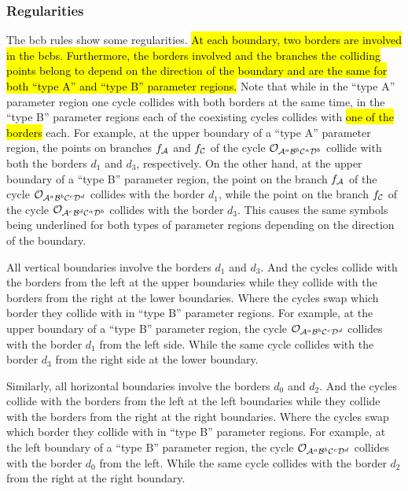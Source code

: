 \subsubsection{Regularities}

The \gls{bcb} rules show some regularities.
\hl{
	At each boundary, two borders are involved in the \glspl{bcb}.
	Furthermore, the borders involved and the branches the colliding points belong to depend on the direction of the boundary and are the same for both ``type A'' and ``type B'' parameter regions.
}
Note that while in the ``type A'' parameter region one cycle collides with both borders at the same time, in the ``type B'' parameter regions each of the coexisting cycles collides with \hl{one of the borders} each.
For example, at the upper boundary of a ``type A'' parameter region, the points on branches $f_{\mathcal{A}}$ and $f_{\mathcal{C}}$ of the cycle $\mathcal{O}_{\mathcal{A}^a\mathcal{B}^b\mathcal{C}^a\mathcal{D}^b}$ collide with both the borders $d_1$ and $d_3$, respectively.
On the other hand, at the upper boundary of a ``type B'' parameter region, the point on the branch $f_{\mathcal{A}}$ of the cycle $\mathcal{O}_{\mathcal{A}^a\mathcal{B}^b\mathcal{C}^c\mathcal{D}^d}$ collides with the border $d_1$, while the point on the branch $f_{\mathcal{C}}$ of the cycle $\mathcal{O}_{\mathcal{A}^c\mathcal{B}^d\mathcal{C}^a\mathcal{D}^b}$ collides with the border $d_3$.
This causes the same symbols being underlined for both types of parameter regions depending on the direction of the boundary.

All vertical boundaries involve the borders $d_1$ and $d_3$.
And the cycles collide with the borders from the left at the upper boundaries while they collide with the borders from the right at the lower boundaries.
Where the cycles swap which border they collide with in ``type B'' parameter regions.
For example, at the upper boundary of a ``type B'' parameter region, the cycle $\mathcal{O}_{\mathcal{A}^a\mathcal{B}^b\mathcal{C}^c\mathcal{D}^d}$ collides with the border $d_1$ from the left side.
While the same cycle collides with the border $d_3$ from the right side at the lower boundary.

Similarly, all horizontal boundaries involve the borders $d_0$ and $d_2$.
And the cycles collide with the borders from the left at the left boundaries while they collide with the borders from the right at the right boundaries.
Where the cycles swap which border they collide with in ``type B'' parameter regions.
For example, at the left boundary of a ``type B'' parameter region, the cycle $\mathcal{O}_{\mathcal{A}^a\mathcal{B}^b\mathcal{C}^c\mathcal{D}^d}$ collides with the border $d_0$ from the left.
While the same cycle collides with the border $d_2$ from the right at the right boundary.
